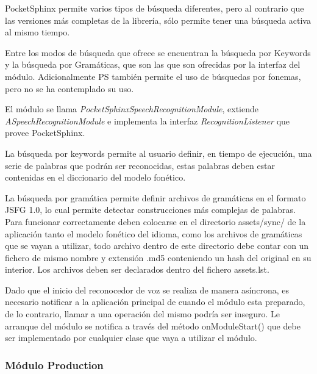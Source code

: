 PocketSphinx permite varios tipos de búsqueda diferentes, pero al contrario que las versiones más completas de la librería, sólo permite tener una búsqueda activa al mismo tiempo.

Entre los modos de búsqueda que ofrece se encuentran la búsqueda por Keywords y la búsqueda por Gramáticas, que son las que son ofrecidas por la interfaz del módulo. Adicionalmente PS también permite el uso de búsquedas por fonemas, pero no se ha contemplado su uso.

El módulo se llama  \textit{PocketSphinxSpeechRecognitionModule}, extiende \textit{ASpeechRecognitionModule} e implementa la interfaz \textit{RecognitionListener} que provee PocketSphinx.

La búsqueda por keywords permite al usuario definir, en tiempo de ejecución, una serie de palabras que podrán ser reconocidas, estas palabras deben estar contenidas en el diccionario del modelo fonético.

La búsqueda por gramática permite definir archivos de gramáticas en el formato  JSFG 1.0\cite{JSFGGrammar}, lo cual permite detectar construcciones más complejas de palabras.
Para funcionar correctamente deben colocarse en el directorio assets/sync/ de la aplicación tanto el modelo fonético del idioma, como los archivos de gramáticas que se vayan a utilizar, todo archivo dentro de este directorio debe contar con un fichero de mismo nombre y extensión .md5 conteniendo un hash del original en su interior. Los archivos deben ser declarados dentro del fichero assets.lst.

Dado que el inicio del reconocedor de voz se realiza de manera asíncrona, es necesario notificar a la aplicación principal de cuando el módulo esta preparado, de lo contrario, llamar a una operación del mismo podría ser inseguro. Le arranque del módulo se notifica a través del método onModuleStart() que debe ser implementado por cualquier clase que vaya a utilizar el  módulo.

\subsubsection{Módulo Production}

